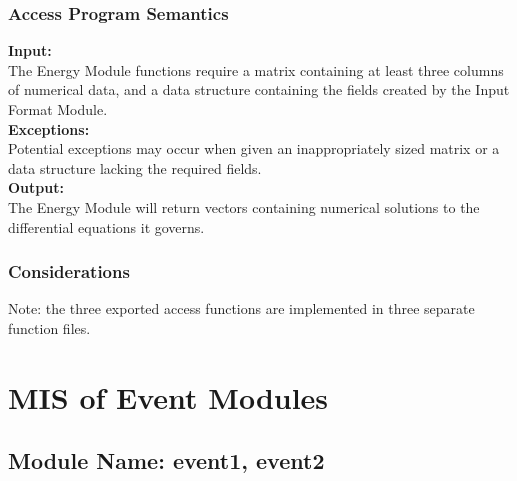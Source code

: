 \documentclass[12pt]{article}
\begin{document}
\subsubsection{Access Program Semantics}

\noindent \textbf{Input:}\\
The Energy Module functions require a matrix containing at least three columns of
numerical data, and a data structure containing the fields created by the 
Input Format Module. \\

\noindent \textbf{Exceptions:}\\
Potential exceptions may occur when given an inappropriately sized matrix or a 
data structure lacking the required fields.\\

\noindent \textbf{Output:}\\
The Energy Module will return vectors containing numerical solutions to
the differential equations it governs. \\


\subsubsection{Considerations}
Note: the three exported access functions are implemented in three separate function files. 


\section{MIS of Event Modules}

\subsection{Module Name: event1, event2}



\end{document}
